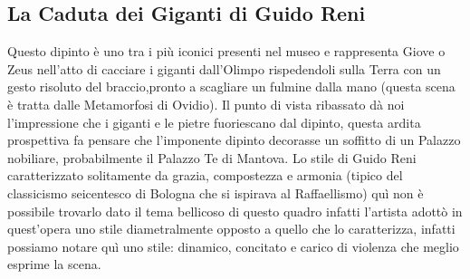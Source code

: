 \documentclass[12pt,a4paper]{article}
\begin{document}
	\subsection{La Caduta dei Giganti di Guido Reni}
	Questo dipinto è uno tra i più iconici presenti nel museo e rappresenta Giove o Zeus nell'atto di cacciare i giganti dall'Olimpo rispedendoli sulla Terra con un gesto risoluto del braccio,pronto a scagliare un fulmine dalla mano (questa scena è tratta dalle Metamorfosi di Ovidio).
	Il punto di vista ribassato dà noi l'impressione che i giganti e le pietre fuoriescano dal dipinto, questa ardita prospettiva fa pensare che l'imponente dipinto decorasse un soffitto di un Palazzo nobiliare, probabilmente il Palazzo Te di Mantova. Lo stile di Guido Reni caratterizzato solitamente da grazia, compostezza e armonia (tipico del classicismo seicentesco di Bologna che si ispirava al Raffaellismo) quì non è possibile trovarlo dato il tema bellicoso di questo quadro infatti l'artista adottò in quest'opera uno stile diametralmente opposto a quello che lo caratterizza, infatti possiamo notare quì uno stile: dinamico, concitato e carico di violenza che meglio esprime la scena.
\end{document}
